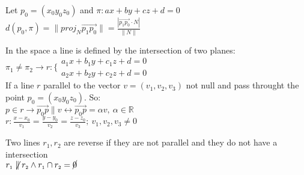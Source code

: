 \begin{theorem}
  Let $p_{\scriptstyle{0}} = (x_{\scriptstyle{0}} y_{\scriptstyle{0}} z_{\scriptstyle{0}})$ and $\pi : ax + by + cz + d = 0$ \\

  $d(p_{\scriptstyle{0}}, \pi) = \|proj_{\scriptscriptstyle{N}} \vec{p_{\scriptscriptstyle{1}} p_{\scriptscriptstyle{0}}}\| = \frac{|\vec{p_{\scriptscriptstyle{1}} p_{\scriptscriptstyle{0}}} \cdot N|}{\|N\|}$
\end{theorem}

\begin{definition}
  In the space a line is defined by the intersection of two planes: \\

  $\pi_{\scriptscriptstyle{1}} \neq \pi_{\scriptscriptstyle{2}} \rightarrow r : \Bigg\{ 
    \begin{matrix}
      a_{\scriptscriptstyle{1}}x + b_{\scriptscriptstyle{1}}y + c_{\scriptscriptstyle{1}}z  + d = 0 \\
      a_{\scriptscriptstyle{2}}x + b_{\scriptscriptstyle{2}}y + c_{\scriptscriptstyle{2}}z  + d = 0
    \end{matrix}$ \\ 

    If a line $r$ parallel to the vector $v = (v_{\scriptstyle{1}}, v_{\scriptstyle{2}}, v_{\scriptstyle{3}})$ not null and pass throught the point $p_{\scriptstyle{0}} = (x_{\scriptstyle{0}} y_{\scriptstyle{0}} z_{\scriptstyle{0}})$. So: \\

    $p \in r \rightarrow \vec{p_{\scriptscriptstyle{0}}p} \parallel v \leftrightarrow \vec{p_{\scriptscriptstyle{0}}p} = \alpha v, \: \alpha \in \mathbb{R}$ \\

    $r : \frac{x - x_{\scriptscriptstyle{0}}}{v_{\scriptstyle{1}}} = \frac{y - y_{\scriptscriptstyle{0}}}{v_{\scriptstyle{2}}} = \frac{z - z_{\scriptscriptstyle{0}}}{v_{\scriptstyle{3}}}; \: v_{\scriptscriptstyle{1}},v_{\scriptscriptstyle{2}}, v_{\scriptscriptstyle{3}} \neq 0$
\end{definition}

\begin{definition}
  Two lines $r_{\scriptscriptstyle{1}}, r_{\scriptscriptstyle{2}}$ are reverse if they are not parallel and they do not have a intersection \\

   $r_{\scriptscriptstyle{1}} \not\parallel r_{\scriptscriptstyle{2}} \land r_{\scriptscriptstyle{1}} \cap r_{\scriptscriptstyle{2}} = \cancel{0}$
\end{definition}

